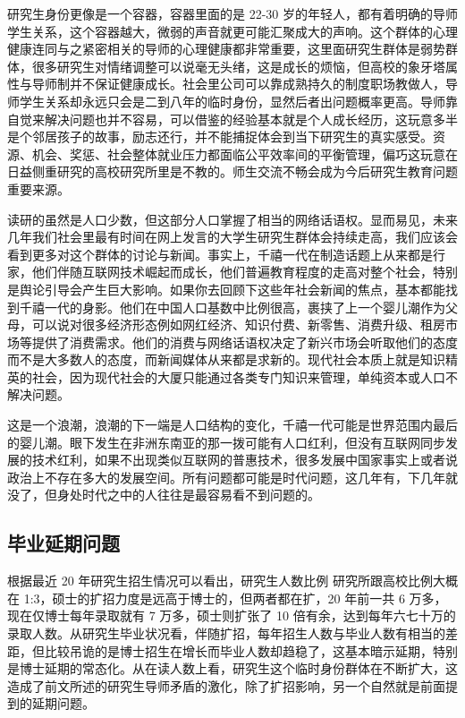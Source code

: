 \documentclass[]{tufte-book}
\begin{document}
研究生身份更像是一个容器，容器里面的是 22-30 岁的年轻人，都有着明确的导师学生关系，这个容器越大，微弱的声音就更可能汇聚成大的声响。这个群体的心理健康连同与之紧密相关的导师的心理健康都非常重要，这里面研究生群体是弱势群体，很多研究生对情绪调整可以说毫无头绪，这是成长的烦恼，但高校的象牙塔属性与导师制并不保证健康成长。社会里公司可以靠成熟持久的制度职场教做人，导师学生关系却永远只会是二到八年的临时身份，显然后者出问题概率更高。导师靠自觉来解决问题也并不容易，可以借鉴的经验基本就是个人成长经历，这玩意多半是个邻居孩子的故事，励志还行，并不能捕捉体会到当下研究生的真实感受。资源、机会、奖惩、社会整体就业压力都面临公平效率间的平衡管理，偏巧这玩意在日益侧重研究的高校研究所里是不教的。师生交流不畅会成为今后研究生教育问题重要来源。

读研的虽然是人口少数，但这部分人口掌握了相当的网络话语权。显而易见，未来几年我们社会里最有时间在网上发言的大学生研究生群体会持续走高，我们应该会看到更多对这个群体的讨论与新闻。事实上，千禧一代在制造话题上从来都是行家，他们伴随互联网技术崛起而成长，他们普遍教育程度的走高对整个社会，特别是舆论引导会产生巨大影响。如果你去回顾下这些年社会新闻的焦点，基本都能找到千禧一代的身影。他们在中国人口基数中比例很高，裹挟了上一个婴儿潮作为父母，可以说对很多经济形态例如网红经济、知识付费、新零售、消费升级、租房市场等提供了消费需求。他们的消费与网络话语权决定了新兴市场会听取他们的态度而不是大多数人的态度，而新闻媒体从来都是求新的。现代社会本质上就是知识精英的社会，因为现代社会的大厦只能通过各类专门知识来管理，单纯资本或人口不解决问题。

这是一个浪潮，浪潮的下一端是人口结构的变化，千禧一代可能是世界范围内最后的婴儿潮。眼下发生在非洲东南亚的那一拨可能有人口红利，但没有互联网同步发展的技术红利，如果不出现类似互联网的普惠技术，很多发展中国家事实上或者说政治上不存在多大的发展空间。所有问题都可能是时代问题，这几年有，下几年就没了，但身处时代之中的人往往是最容易看不到问题的。

\hypertarget{ux6bd5ux4e1aux5ef6ux671fux95eeux9898}{%
\subsection{毕业延期问题}\label{ux6bd5ux4e1aux5ef6ux671fux95eeux9898}}

根据最近 20 年研究生招生情况可以看出，研究生人数比例 研究所跟高校比例大概在 1:3，硕士的扩招力度是远高于博士的，但两者都在扩，20 年前一共 6 万多，现在仅博士每年录取就有 7 万多，硕士则扩张了 10 倍有余，达到每年六七十万的录取人数。从研究生毕业状况看，伴随扩招，每年招生人数与毕业人数有相当的差距，但比较吊诡的是博士招生在增长而毕业人数却趋稳了，这基本暗示延期，特别是博士延期的常态化。从在读人数上看，研究生这个临时身份群体在不断扩大，这造成了前文所述的研究生导师矛盾的激化，除了扩招影响，另一个自然就是前面提到的延期问题。
\end{document}
